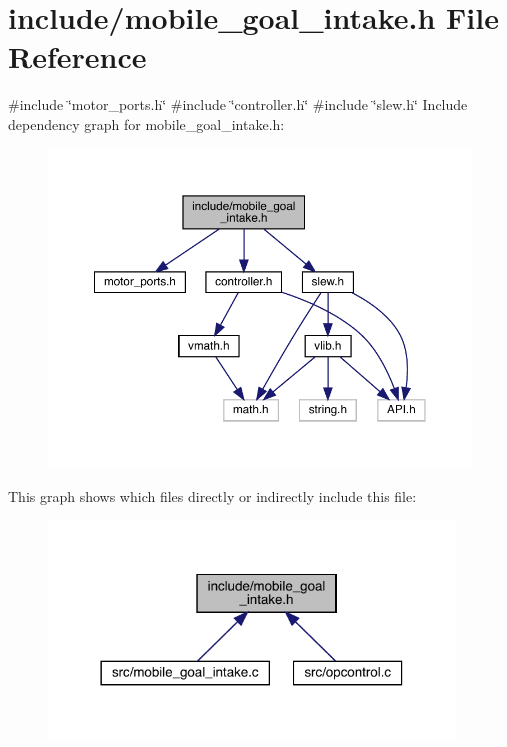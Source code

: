 \section{include/mobile\+\_\+goal\+\_\+intake.h File Reference}
\label{mobile__goal__intake_8h}
{\ttfamily \#include \char`\"{}motor\+\_\+ports.\+h\char`\"{}}\newline
{\ttfamily \#include \char`\"{}controller.\+h\char`\"{}}\newline
{\ttfamily \#include \char`\"{}slew.\+h\char`\"{}}\newline
Include dependency graph for mobile\+\_\+goal\+\_\+intake.\+h\+:
\nopagebreak
\begin{figure}[H]
\begin{center}
\leavevmode
\includegraphics[width=350pt]{mobile__goal__intake_8h__incl}
\end{center}
\end{figure}
This graph shows which files directly or indirectly include this file\+:
\nopagebreak
\begin{figure}[H]
\begin{center}
\leavevmode
\includegraphics[width=306pt]{mobile__goal__intake_8h__dep__incl}
\end{center}
\end{figure}
